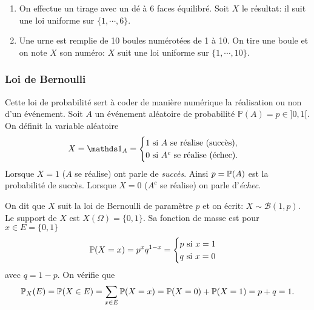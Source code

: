 \begin{exemple}
	\begin{enumerate}
		\item On effectue un tirage avec un dé à 6 faces équilibré. Soit $X$ le résultat: il suit une loi uniforme sur $\{1,\cdots,6\}$.
		\item Une urne est remplie de 10 boules numérotées de 1 à 10. On tire une boule et on note $X$ son numéro: $X$ suit une loi uniforme sur $\{1,\cdots,10\}$.
	\end{enumerate}
\end{exemple}
\sld{\vfill\pagebreak[5]}%

\subsubsection{Loi de Bernoulli}

Cette loi de probabilité sert à coder de manière numérique la réalisation ou non d'un événement. Soit $A$ un événement aléatoire de probabilité $\mathbb{P} (A) = p \in ] 0, 1[$. On définit la variable aléatoire 
$$ X = \one_A = \begin{cases}
		1  \textrm{ si } A \textrm{ se réalise (succès)}  , \\
		0  \textrm{ si } A^c \textrm{ se réalise (échec)}. 
	\end{cases} $$
	 Lorsque $X=1$ (\ie $A$ se réalise) ont parle de \emph{succès}. Ainsi $p = \P(A)$ est la probabilité de succès. Lorsque $X=0$ (\ie $A^c$ se réalise) on parle d'\emph{échec}.
\sld{\vfill\pagebreak[5]}%


On dit que $X$ suit la loi de Bernoulli de paramètre $p$  et on écrit: $X \sim \mathcal{B} (1, p)$. Le support de $X$  est $X(\Omega) =\{0, 1\}$. Sa fonction de masse est pour $x \in  E = \{0, 1\}$ 
\[\redspace  \mathbb{P}(X=x) = p^x q^{1-x} = \begin{cases}
		p \text{ si $x=1$} \\ q \text{ si $x=0$}
\end{cases}\] avec $q=1-p$.
On vérifie que 
\[\redspace \mathbb{P}_X (E) = \mathbb{P}(X \in E) = \sum_{x \in E} \mathbb{P}(X=x) = \mathbb{P}(X=0) + \mathbb{P}(X=1) = p+q=1.\]
\begin{center}
	
\end{center}
\sld{\vfill\pagebreak[5]}%


